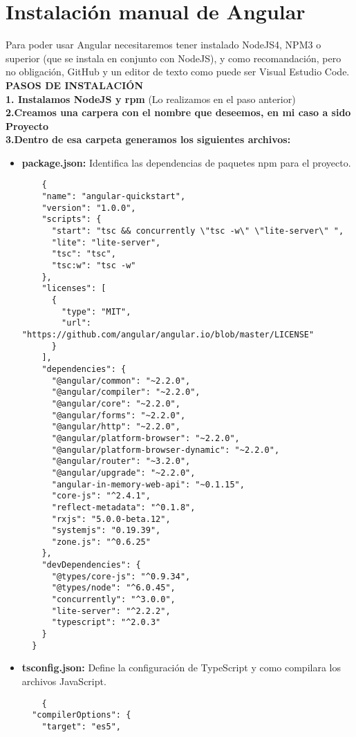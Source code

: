 \documentclass[openany]{book}
\begin{document}
\chapter{Instalación manual de Angular }
Para poder usar Angular necesitaremos tener instalado NodeJS4, NPM3 o superior (que se instala en conjunto con NodeJS), y como recomandación, pero no obligación, GitHub y un editor de texto como puede ser Visual Estudio Code. 
\\ \textbf{PASOS DE INSTALACIÓN}\\
\textbf{1. Instalamos NodeJS y rpm} (Lo realizamos en el paso anterior)\\
\textbf{2.Creamos una carpera con el nombre que deseemos, en mi caso a sido Proyecto\\ 3.Dentro de esa carpeta generamos los siguientes archivos:}
\begin{itemize}
  \item \textbf{package.json:} Identifica las dependencias de paquetes npm para el proyecto.
  \begin{lstlisting}
    {
    "name": "angular-quickstart",
    "version": "1.0.0",
    "scripts": {
      "start": "tsc && concurrently \"tsc -w\" \"lite-server\" ",
      "lite": "lite-server",
      "tsc": "tsc",
      "tsc:w": "tsc -w"
    },
    "licenses": [
      {
        "type": "MIT",
        "url": "https://github.com/angular/angular.io/blob/master/LICENSE"
      }
    ],
    "dependencies": {
      "@angular/common": "~2.2.0",
      "@angular/compiler": "~2.2.0",
      "@angular/core": "~2.2.0",
      "@angular/forms": "~2.2.0",
      "@angular/http": "~2.2.0",
      "@angular/platform-browser": "~2.2.0",
      "@angular/platform-browser-dynamic": "~2.2.0",
      "@angular/router": "~3.2.0",
      "@angular/upgrade": "~2.2.0",
      "angular-in-memory-web-api": "~0.1.15",
      "core-js": "^2.4.1",
      "reflect-metadata": "^0.1.8",
      "rxjs": "5.0.0-beta.12",
      "systemjs": "0.19.39",
      "zone.js": "^0.6.25"
    },
    "devDependencies": {
      "@types/core-js": "^0.9.34",
      "@types/node": "^6.0.45",
      "concurrently": "^3.0.0",
      "lite-server": "^2.2.2",
      "typescript": "^2.0.3"
    }
  }
  \end{lstlisting}
  \vspace*{5\baselineskip}
  \item \textbf{tsconfig.json:} Define la configuración de TypeScript y como compilara los archivos JavaScript.
  \begin{lstlisting}
    {
  "compilerOptions": {
    "target": "es5",

\end{lstlisting}
\end{itemize}
\end{document}

